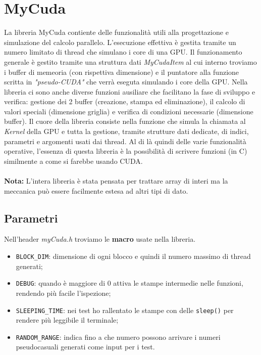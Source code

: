 \documentclass[binding=0.6cm, noexaminfo]{sapthesis}\usepackage{microtype}
\begin{document}
\chapter{MyCuda}
La libreria MyCuda contiente delle funzionalità 
utili alla progettazione e simulazione del calcolo parallelo. L'esecuzione 
effettiva è gestita tramite un numero limitato di thread che simulano i core di una GPU.
Il funzionamento generale è gestito tramite una struttura dati \textit{MyCudaItem} al cui 
interno troviamo i buffer di memeoria (con rispettiva dimensione) e il puntatore alla funzione 
scritta in \textit{"pseudo-CUDA"} che verrà eseguta simulando i core
della GPU. Nella libreria ci sono anche diverse funzioni ausiliare che facilitano la fase di sviluppo e verifica: gestione dei 2 buffer (creazione,
 stampa ed eliminazione), il calcolo di valori speciali 
 (dimensione griglia) e verifica di condizioni necessarie (dimensione buffer). 
Il cuore della libreria consiste nella funzione che simula la chiamata al \textit{Kernel} della GPU 
e tutta la gestione, tramite strutture dati 
dedicate, di indici, parametri e argomenti usati dai thread. 
Al di là quindi delle varie funzionalità operative, l'essenza di questa
libreria è la possibilità di scrivere funzioni (in C) similmente a come si farebbe usando CUDA. 
\\\\    
\textbf{Nota:} L'intera libreria è stata pensata per trattare array di interi ma 
la meccanica può essere facilmente estesa ad altri tipi di dato.    

\section{Parametri}
Nell'header \textit{myCuda.h} troviamo le \textbf{macro} usate nella libreria. 
\begin{itemize}
    \item \texttt{BLOCK\_DIM}: dimensione di ogni blocco e quindi il 
    numero massimo di thread generati;
    \item \texttt{DEBUG}: quando è maggiore di 0 attiva le stampe intermedie nelle funzioni, rendendo più facile l'ispezione;
    \item  \texttt{SLEEPING\_TIME}: nei test ho rallentato le stampe con delle \texttt{sleep()} per rendere più 
    leggibile il terminale;
    \item \texttt{RANDOM\_RANGE}: indica fino a che numero possono arrivare i numeri pseudocasuali generati come input 
    per i test.
\end{itemize} 
\end{document}
